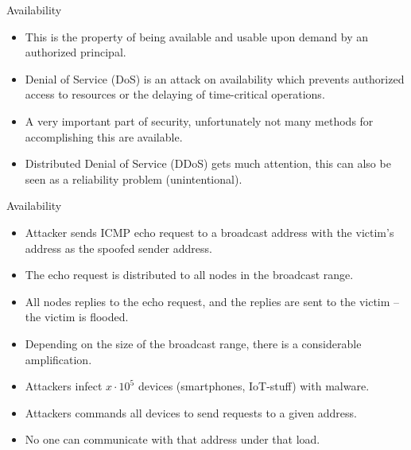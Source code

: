 \documentclass{beamer}
\begin{document}
\begin{frame}{Availability}
  \begin{itemize}
    \item This is the property of being available and usable upon demand by an 
      authorized principal.

    \item Denial of Service (DoS) is an attack on availability which prevents 
      authorized access to resources or the delaying of time-critical 
      operations.

    \item A very important part of security, unfortunately not many methods for 
      accomplishing this are available.

    \item Distributed Denial of Service (DDoS) gets much attention, this can 
      also be seen as a reliability problem (unintentional).
  \end{itemize}
\end{frame}

\begin{frame}{Availability}
  \begin{example}
    \begin{itemize}
      \item Attacker sends ICMP echo request to a broadcast address with the 
        victim's address as the spoofed sender address.

      \item The echo request is distributed to all nodes in the broadcast 
        range.

      \item All nodes replies to the echo request, and the replies are sent to 
        the victim -- the victim is flooded.

      \item Depending on the size of the broadcast range, there is 
        a considerable amplification.
    \end{itemize}
  \end{example}
\end{frame}

\begin{frame}
  \begin{example}[DDoS]
    \begin{itemize}
      \item Attackers infect \(x\cdot 10^5\) devices (smartphones, IoT-stuff) 
        with malware.
      \item Attackers commands all devices to send requests to a given address.
      \item No one can communicate with that address under that load.
    \end{itemize}
  \end{example}
\end{frame}
\end{document}
